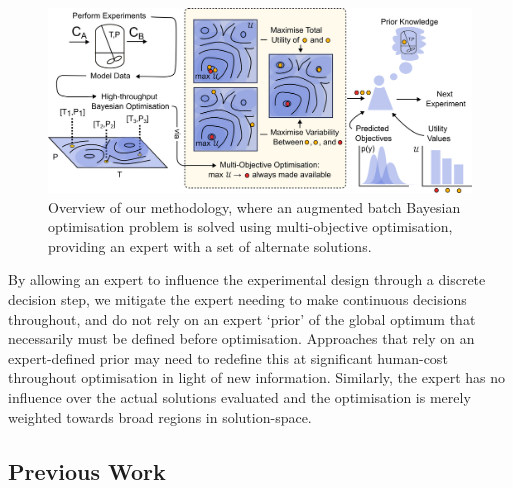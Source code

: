 \documentclass[
  letterpaper,
  DIV=11,
  numbers=noendperiod,
  oneside]{scrartcl}
\begin{document}
\begin{figure}

{\centering \includegraphics{overview_figure.png}

}

\caption{\label{fig-overview}Overview of our methodology, where an
augmented batch Bayesian optimisation problem is solved using
multi-objective optimisation, providing an expert with a set of
alternate solutions.}

\end{figure}

By allowing an expert to influence the experimental design through a
discrete decision step, we mitigate the expert needing to make
continuous decisions throughout, and do not rely on an expert `prior' of
the global optimum that necessarily must be defined before optimisation.
Approaches that rely on an expert-defined prior may need to redefine
this at significant human-cost throughout optimisation in light of new
information. Similarly, the expert has no influence over the actual
solutions evaluated and the optimisation is merely weighted towards
broad regions in solution-space.

\hypertarget{previous-work}{%
\subsection{Previous Work}\label{previous-work}}
\end{document}
